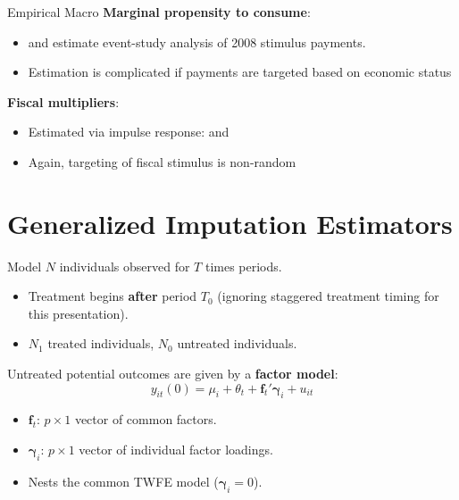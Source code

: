 \documentclass[aspectratio=43,t]{beamer}
\begin{document}
\begin{frame}{Empirical Macro}
  \textbf{Marginal propensity to consume}:
  \begin{itemize}
    \item \citet{broda2014economic} and \citet{parker2013consumer} estimate event-study analysis of 2008 stimulus payments.
    
    \item Estimation is complicated if payments are targeted based on economic status
  \end{itemize}

  \smallskip
  \textbf{Fiscal multipliers}:
  \begin{itemize}
    \item Estimated via impulse response: \citet{ilzetzki2013big} and \citet{brinca2016fiscal}
    \item Again, targeting of fiscal stimulus is non-random
  \end{itemize}
\end{frame}

\section{Generalized Imputation Estimators}

\begin{frame}{Model}
    $N$ individuals observed for $T$ times periods.
    \begin{itemize}
        \item Treatment begins \textbf{after} period $T_0$ (ignoring staggered treatment timing for this presentation).
        \item $N_1$ treated individuals, $N_0$ untreated individuals.
    \end{itemize}
    
    \pause
    \bigskip
    Untreated potential outcomes are given by a \textbf{factor model}:
    \begin{equation}
        y_{it}(0) = \mu_i + \theta_t + \bm f_t' \bm \gamma_i + u_{it}
    \end{equation}
    
    \vspace{-3mm}
    \begin{itemize}
        \item $\bm f_t$: $p \times 1$ vector of common factors.
        \item $\bm \gamma_i$: $p \times 1$ vector of individual factor loadings.
        \item Nests the common TWFE model ($\bm \gamma_i = 0$). 
    \end{itemize}
\end{frame}
\end{document}

